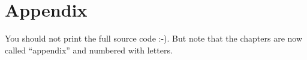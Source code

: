 \chapter{Appendix}

You should not print the full source code :-). But note that the chapters are now called ``appendix'' and numbered with letters.
